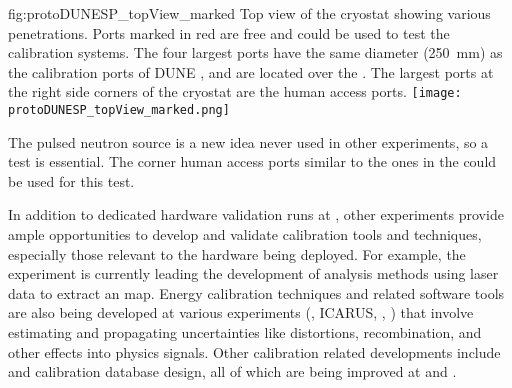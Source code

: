 \begin{dunefigure}{fig:protoDUNESP_topView_marked}
{Top view of the  cryostat showing various penetrations. Ports marked in red are free and could be used to test the calibration systems. The four largest ports have the same diameter (\SI{250}{\milli\m}) as the calibration ports of DUNE , and are located over the . The largest ports at the right side corners of the cryostat are the human access ports.}
\texttt{[image: protoDUNESP\_topView\_marked.png]}
\end{dunefigure}


The pulsed neutron source is a new idea never used in other experiments, so a  test is essential. The corner human access ports similar to the ones in the   could be used for this test.


In addition to dedicated hardware validation runs at , other  experiments provide ample opportunities to develop and validate calibration tools and techniques, especially those relevant to the hardware being deployed. For example, the  experiment is currently leading the development of analysis methods using laser data to extract an \efield map. Energy calibration techniques and related software tools are also being developed at various experiments (, ICARUS, , ) that involve estimating and propagating uncertainties like \efield distortions, recombination, and other effects into physics signals. Other calibration related developments include  and calibration database design, all of which are being improved at  and .
 

